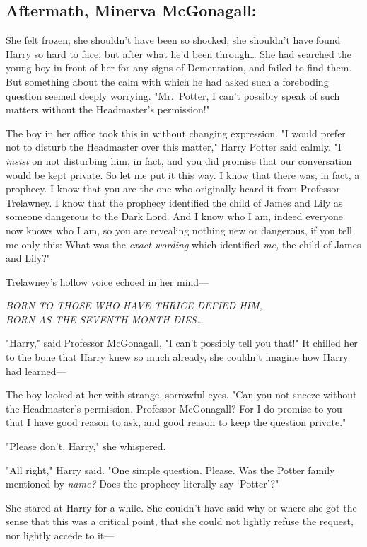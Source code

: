 \subsection{Aftermath, Minerva McGonagall:}

She felt frozen; she shouldn't have been so shocked, she shouldn't have found 
Harry so hard to face, but after what he'd been through{\ldots} She had 
searched the young boy in front of her for any signs of Dementation, and failed 
to find them. But something about the calm with which he had asked such a 
foreboding question seemed deeply worrying. "Mr.~Potter, I can't possibly speak 
of such matters without the Headmaster's permission!"

The boy in her office took this in without changing expression. "I would prefer 
not to disturb the Headmaster over this matter," Harry Potter said calmly. "I 
\emph{insist} on not disturbing him, in fact, and you did promise that our 
conversation would be kept private. So let me put it this way. I know that 
there was, in fact, a prophecy. I know that you are the one who originally 
heard it from Professor Trelawney. I know that the prophecy identified the 
child of James and Lily as someone dangerous to the Dark Lord. And I know who I 
am, indeed everyone now knows who I am, so you are revealing nothing new or 
dangerous, if you tell me only this: What was the \emph{exact wording} which 
identified \emph{me,} the child of James and Lily?"

Trelawney's hollow voice echoed in her mind---

\emph{BORN TO THOSE WHO HAVE THRICE DEFIED HIM,\\
BORN AS THE SEVENTH MONTH DIES{\ldots}}

"Harry," said Professor McGonagall, "I can't possibly tell you that!" It 
chilled her to the bone that Harry knew so much already, she couldn't imagine 
how Harry had learned---

The boy looked at her with strange, sorrowful eyes. "Can you not sneeze without 
the Headmaster's permission, Professor McGonagall? For I do promise to you that 
I have good reason to ask, and good reason to keep the question private."

"Please don't, Harry," she whispered.

"All right," Harry said. "One simple question. Please. Was the Potter family 
mentioned by \emph{name?} Does the prophecy literally say `Potter'?"

She stared at Harry for a while. She couldn't have said why or where she got 
the sense that this was a critical point, that she could not lightly refuse the 
request, nor lightly accede to it---

